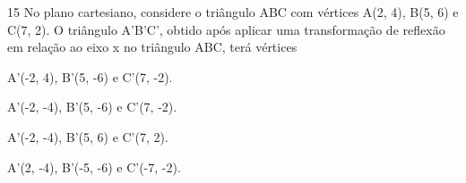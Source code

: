 

\num{15} No plano cartesiano, considere o triângulo ABC com vértices A(2, 4),
B(5, 6) e C(7, 2). O triângulo A'B'C', obtido após aplicar uma transformação de
reflexão em relação ao eixo x no triângulo ABC, terá vértices

\begin{escolha}
\item A'(-2, 4), B'(5, -6) e C'(7, -2).
\item A'(-2, -4), B'(5, -6) e C'(7, -2).
\item A'(-2, -4), B'(5, 6) e C'(7, 2).
\item A'(2, -4), B'(-5, -6) e C'(-7, -2).
\end{escolha}









